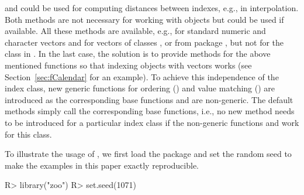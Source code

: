 \documentclass{Z}
\begin{document}
and  could be used for computing distances between indexes, e.g.,
in interpolation. Both methods are not necessary for working with  
objects but could be used if available.
All these methods are available, e.g., for standard numeric and character vectors and for
vectors of classes ,  or 
from package , but not for the class  in .
In the last case, the solution is to provide methods for the above mentioned
functions so that indexing  objects with  vectors works
(see Section~\ref{sec:fCalendar} for an example).
To achieve this  independence of the index class, new generic functions for
ordering () and value matching () are introduced
as the corresponding base functions  and  are 
non-generic. The default methods simply call the corresponding base functions, i.e.,
no new method needs to be introduced for a particular index class if the 
non-generic functions  and  work for this class.

To illustrate the usage of , we first load the package and set the
random seed to make the examples in this paper exactly reproducible.

\begin{Schunk}
\begin{Sinput}
R> library("zoo")
R> set.seed(1071)
\end{Sinput}
\end{Schunk}
\end{document}
